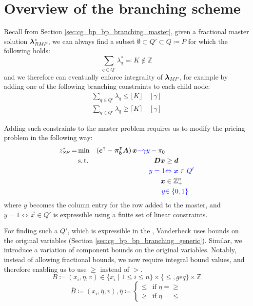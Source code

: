 \section{Overview of the branching scheme}\label{sec:cmpbnd_overview}
Recall from Section \ref{sec:cg_bp_bp_branching_master}, given a fractional master solution ${\bm{\lambda}}^*_{\textit{RMP}}{}$, we can always find a subset $\emptyset \subset Q' \subset Q \coloneqq \ddot{P}$ for which the following holds:
\begin{equation}\label{eq:compbnd_branching_master}
\sum_{q \in Q'} \lambda_q^* \eqqcolon K \not\in \mathbb{Z}
\end{equation}
and we therefore can eventually enforce integrality of ${\bm{\lambda}}_{\textit{MP}}{}$, for example by adding one of the following branching constraints to each child node:
\begin{equation}
\begin{aligned}
\sum_{q \in Q'} \lambda_q \leq \lfloor K \rfloor \quad \left[\gamma\right] \\
\sum_{q \in Q'} \lambda_q \geq \lceil K \rceil \quad \left[\gamma\right]
\end{aligned}
\end{equation}

Adding such constraints to the master problem requires us to modify the pricing problem in the following way:
\begin{equation}
\begin{aligned}
z^*_\SP{} = &\min & \left( \vec{c}\transpose - \vec{\pi}_\vec{b}\transpose \mat{A} \right) \vec{x} {\color{blue} - \gamma y} - \pi_0 & \\
&\st & \mat{D} \vec{x} & \geq \vec{d} \\
&& {\color{blue} y = 1} & {\color{blue} \Leftrightarrow \vec{x} \in Q'} \\
&& \vec{x} & \in \mathbb{Z}_+^n \\
&& {\color{blue} y} & {\color{blue} \in \{0, 1\}}
\end{aligned}
\end{equation}
where $y$ becomes the column entry for the row added to the master, and $y = 1 \Leftrightarrow \vec{x} \in Q'$ is expressible using a finite set of linear constraints.

For finding such a $Q'$, which is expressible in the \SP{}, Vanderbeck uses bounds on the original variables (Section \ref{sec:cg_bp_bp_branching_generic}). Similar, we introduce a variation of component bounds on the original variables. Notably, instead of allowing fractional bounds, we now require integral bound values, and therefore enabling us to use $\geq$ instead of $>$.
\begin{equation}
B \coloneqq \left( x_i, \eta, v \right) \in \{x_i \mid 1 \leq i \leq n\} \times \{\leq, geq\} \times \mathbb{Z}
\end{equation}
\begin{equation}
\bar{B} \coloneqq \left( x_i, \bar{\eta}, v \right), \bar{\eta} \coloneqq \begin{cases} \leq & \text{if } \eta = \geq \\ \geq & \text{if } \eta = \leq \end{cases}
\end{equation}

